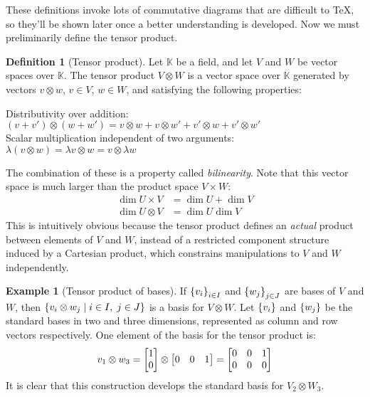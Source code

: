\documentclass{article}
\theoremstyle{definition}
\newtheorem{Definition}{Definition}
\newtheorem*{Example*}{Example}
\theoremstyle{remark}
\theoremstyle{underline}
\theoremstyle{underline}
\begin{document}
	These definitions invoke lots of commutative diagrams that are difficult to \TeX, so they'll be shown later once a better understanding is developed. Now we must preliminarily define the tensor product.
	
	\begin{Definition}[Tensor product]\label{def:TensorProd}
		Let $\mathbb{K}$ be a field, and let $V$ and $W$ be vector spaces over $\mathbb{K}$. The tensor product $ V\otimes W $ is a vector space over $ \mathbb{K} $ generated by vectors $v \otimes w$, $v \in V$, $w \in W$, and satisfying the following properties:
		\begin{center}
			Distributivity over addition: \hfill $ (v + v') \otimes (w + w') = v \otimes w + v \otimes w' + v' \otimes w + v' \otimes w'$\\
			Scalar multiplication independent of two arguments: \hfill $ \lambda(v \otimes w) = \lambda v \otimes w = v \otimes \lambda w$
		\end{center}
	\end{Definition}
	
	The combination of these is a property called \emph{bilinearity}. Note that this vector space is much larger than the product space $V \times W$:
	\begin{align*}
		\dim U \times V & = \dim U + \dim V\\
		\dim U \otimes V & = \dim U \dim V
	\end{align*}
	This is intuitively obvious because the tensor product defines an \emph{actual} product between elements of $V$ and $W$, instead of a restricted component structure induced by a Cartesian product, which constrains manipulations to $V$ and $W$ independently.
	
	\begin{Example*}[Tensor product of bases]
		If $ \qty{v_i}_{i \in I}$ and $ \qty{w_j}_{j \in J} $ are bases of $V$ and $W$, then $ \qty{v_i \otimes w_j \mid i \in I, \; j \in J}$ is a basis for $V \otimes W$. Let $ \qty{v_i}$ and $\qty{w_j} $ be the standard bases in two and three dimensions, represented as column and row vectors respectively. One element of the basis for the tensor product is:
		\begin{gather*}
		v_1 \otimes w_3 = \mqty[1 \\ 0] \otimes \mqty[0 & 0 & 1]  = \mqty[0 & 0 & 1 \\ 0 & 0 & 0]
		\end{gather*}
		It is clear that this construction develops the standard basis for $V_{2} \otimes W_{3}$.
	\end{Example*}
	
\end{document}

